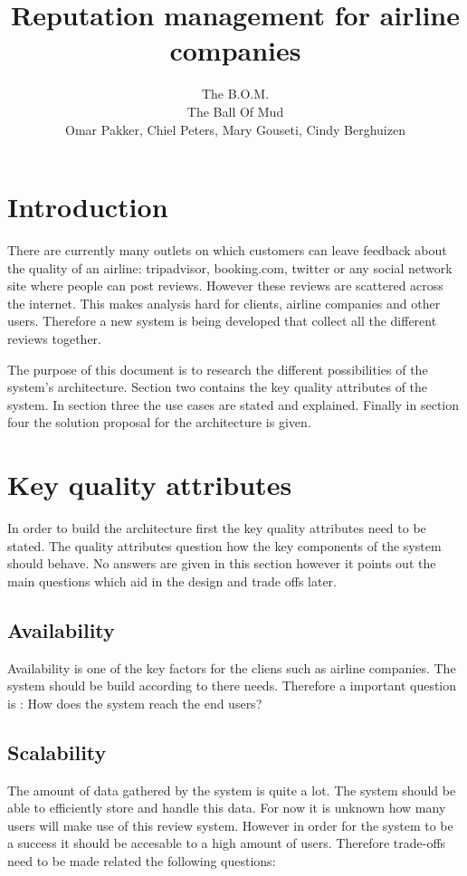 \documentclass{article}
\author{ The B.O.M. \\
\small{The Ball Of Mud}\\
\small{Omar Pakker, Chiel Peters, Mary Gouseti, Cindy Berghuizen}}
\title{Reputation management for airline companies}
\begin{document}
\maketitle

\section*{Introduction}

There are currently many outlets on which customers can leave feedback about the quality of an airline: tripadvisor, booking.com, twitter or any social network site where people can post reviews. However these reviews are scattered across the internet. This makes analysis hard for clients, airline companies and other users. Therefore a new system is being developed that collect all the different reviews together.

The purpose of this document is to research the different possibilities of the system's architecture. Section two contains the key quality attributes of the system. In section three the use cases are stated and explained. Finally in section four the solution proposal for the architecture is given.

\section*{Key quality attributes}

In order to build the architecture first the key quality attributes need to be stated. The quality attributes question how the key components of the system should behave. No answers are given in this section however it points out the main questions which aid in the design and trade offs later.

\subsection*{Availability}
Availability is one of the key factors for the cliens such as airline companies. The system should be build according to there needs. Therefore a important question is : How does the system reach the end users?

\subsection*{Scalability}
The amount of data gathered by the system is quite a lot. The system should be able to efficiently store and handle this data. 
For now it is unknown how many users will make use of this review system. However in order for the system to be a success it should be accesable to a high amount of users. Therefore trade-offs need to be made related the following questions:
\end{document}
